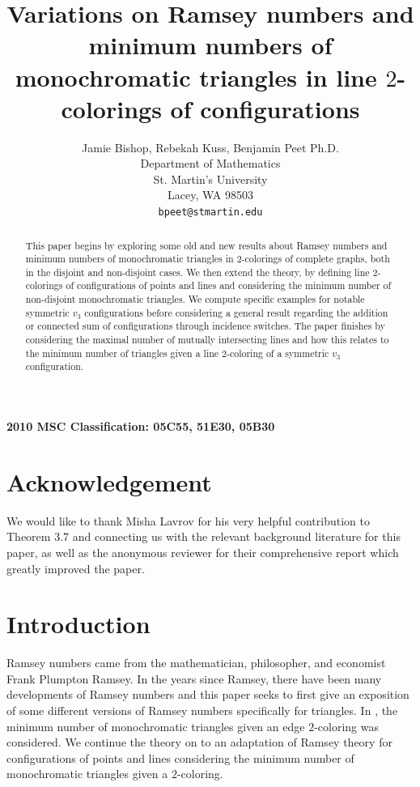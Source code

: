\documentclass{article}
\title{Variations on Ramsey numbers and minimum numbers of monochromatic triangles in line $2$-colorings of configurations}
\author{
  Jamie Bishop, Rebekah Kuss, Benjamin Peet Ph.D.\\
  Department of Mathematics\\
  St. Martin's University\\
  Lacey, WA 98503 \\
  \texttt{bpeet@stmartin.edu} \\
}
\theoremstyle{definition}
\theoremstyle{remark}
\theoremstyle{definition}
\begin{document}
\maketitle

\begin{abstract}
This paper begins by exploring some old and new results about Ramsey numbers and minimum numbers of monochromatic triangles in $2$-colorings of complete graphs, both in the disjoint and non-disjoint cases. We then extend the theory, by defining line $2$-colorings of configurations of points and lines and considering the minimum number of non-disjoint monochromatic triangles. We compute specific examples for notable symmetric $v_{3}$ configurations before considering a general result regarding the addition or connected sum of configurations through incidence switches. The paper finishes by considering the maximal number of mutually intersecting lines and how this relates to the minimum number of triangles given a line $2$-coloring of a symmetric $v_{3}$ configuration.
\end{abstract}


\textbf{2010 MSC Classification: 05C55, 51E30, 05B30} 

\section*{Acknowledgement}

We would like to thank Misha Lavrov for his very helpful contribution to Theorem 3.7 and connecting us with the relevant background literature for this paper, as well as the anonymous reviewer for their comprehensive report which greatly improved the paper.

\section{Introduction}

Ramsey numbers came from the mathematician, philosopher, and economist Frank Plumpton Ramsey. In the years since Ramsey, there have been many developments of Ramsey numbers and this paper seeks to first give an exposition of some different versions of Ramsey numbers specifically for triangles. In \cite{goodman1959sets}, the minimum number of monochromatic triangles given an edge $2$-coloring was considered. We continue the theory on to an adaptation of Ramsey theory for configurations of points and lines considering the minimum number of monochromatic triangles given a $2$-coloring.
\end{document}
